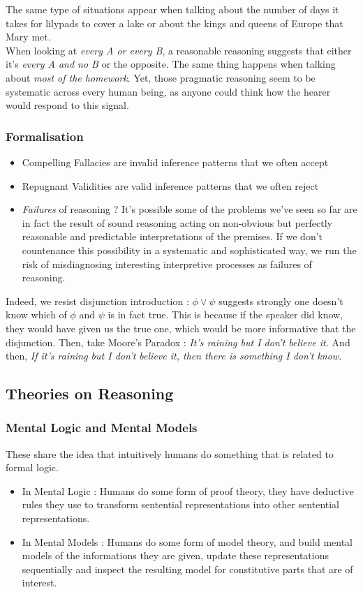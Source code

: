 \documentclass{cours}
\begin{document}
The same type of situations appear when talking about the number of days it takes for lilypads to cover a lake or about the kings and queens of Europe that Mary met.\\
When looking at \textsl{every A or every B}, a reasonable reasoning suggests that either it's \textsl{every A and no B} or the opposite. The same thing happens when talking about \textsl{most of the homework}. Yet, those pragmatic reasoning seem to be systematic across every human being, as anyone could think how the hearer would respond to this signal. 

\subsubsection{Formalisation}
\begin{itemize}
    \item Compelling Fallacies are invalid inference patterns that we often accept
    \item Repugnant Validities are valid inference patterns that we often reject
    \item \emph{Failures} of reasoning ? It's possible some of the problems we've seen so far are in fact the result of sound reasoning acting on non-obvious but perfectly reasonable and predictable interpretations of the premises. If we don't countenance this possibility in a systematic and sophisticated way, we run the risk of misdiagnosing interesting interpretive processes as failures of reasoning. 
\end{itemize}
Indeed, we resist disjunction introduction : $\phi \lor \psi$ suggests strongly one doesn't know which of $\phi$ and $\psi$ is in fact true. This is because if the speaker did know, they would have given us the true one, which would be more informative that the disjunction. Then, take Moore's Paradox : 
\textsl{It's raining but I don't believe it.} And then, \textsl{If it's raining but I don't believe it, then there is something I don't know.}\\

\subsection{Theories on Reasoning}
\subsubsection{Mental Logic and Mental Models}
These share the idea that intuitively humans do something that is related to formal logic.
\begin{itemize}
    \item In Mental Logic : Humans do some form of proof theory, they have deductive rules they use to transform sentential representations into other sentential representations. 
    \item In Mental Models : Humans do some form of model theory, and build mental models of the informations they are given, update these representations sequentially and inspect the resulting model for constitutive parts that are of interest. 
\end{itemize}
\end{document}
